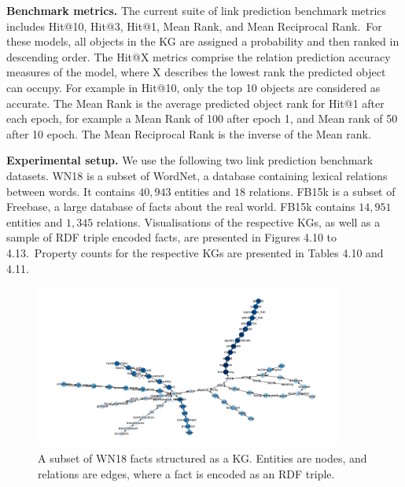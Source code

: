 \noindent \textbf{Benchmark metrics.} The current suite of link prediction benchmark metrics includes Hit@10, Hit@3, Hit@1, Mean Rank, and Mean Reciprocal Rank.\ For these models, all objects in the KG are assigned a probability and then ranked in descending order. The Hit@X metrics comprise the relation prediction accuracy measures of the model, where X describes the lowest rank the predicted object can occupy. For example in Hit@10, only the top 10 objects are considered as accurate. The Mean Rank is the average predicted object rank for Hit@1 after each epoch, for example a Mean Rank of 100 after epoch 1, and Mean rank of 50 after 10 epoch. The Mean Reciprocal Rank is the inverse of the Mean rank. \par

\noindent \textbf{Experimental setup.} We use the following two link prediction benchmark datasets. WN18 \citep{bordes2013translating} is a subset of WordNet, a database containing lexical relations between words. It contains $ 40, 943 $ entities and $ 18 $ relations. FB15k \citep{bordes2013translating} is a subset of Freebase, a large database of facts about the real world. FB15k contains $ 14, 951 $ entities and $ 1, 345 $ relations. Visualisations of the respective KGs, as well as a sample of RDF triple encoded facts, are presented in Figures 4.10 to 4.13.\ Property counts for the respective KGs are presented in Tables 4.10 and 4.11. \par

\bigskip

\begin{figure}[H]
   	\centering
    	\includegraphics[width=0.9\textwidth, height=0.5\textwidth]{WN18_Graph}
	\captionsetup{justification=centering}
	\caption{A subset of WN18 facts structured as a KG. Entities are nodes, and relations are edges, where a fact is encoded as an RDF triple.}
\end{figure}

